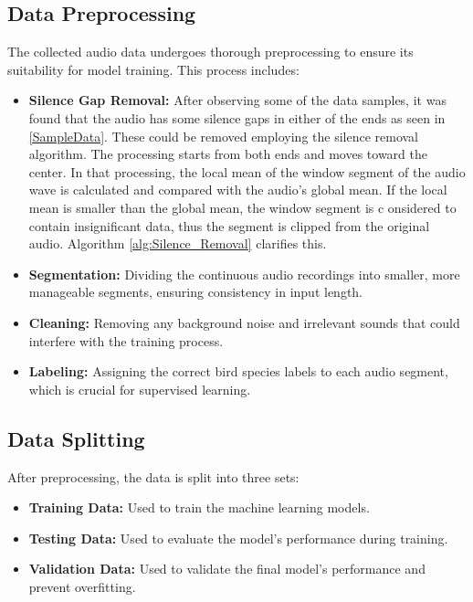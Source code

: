 \subsection{Data Preprocessing}

The collected audio data undergoes thorough preprocessing to ensure its
suitability for model training. This process includes:
\begin{itemize}
    \item \textbf{Silence Gap Removal:} After observing some of the data samples, it was found that the audio has some silence gaps
     in either of the ends as seen in \ref{SampleData}. These could be removed employing the silence removal algorithm. The processing
      starts from both ends and moves toward the center. In that processing, the local mean of the window segment of the audio wave is
       calculated and compared with the audio’s global mean. If the local mean is smaller than the global mean, the window segment is c
       onsidered to contain insignificant data, thus the segment is clipped from the original audio\cite{9850832}. Algorithm \ref{alg:Silence_Removal} 
       clarifies this.
    \item \textbf{Segmentation:} Dividing the continuous audio recordings into smaller, more manageable segments, ensuring consistency in input length.
    \item \textbf{Cleaning:} Removing any background noise and irrelevant sounds that could interfere with the training process.
    \item \textbf{Labeling:} Assigning the correct bird species labels to each audio segment, which is crucial for supervised learning.
\end{itemize}

\subsection{Data Splitting}

After preprocessing, the data is split into three sets:
\begin{itemize}
    \item \textbf{Training Data:} Used to train the machine learning models.
    \item \textbf{Testing Data:} Used to evaluate the model's performance during training.
    \item \textbf{Validation Data:} Used to validate the final model's performance and prevent overfitting.
\end{itemize}


